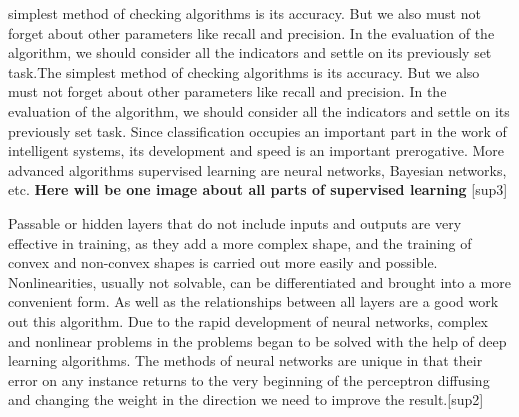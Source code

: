 simplest method of checking algorithms is its accuracy. But we also must not forget about other parameters like recall and precision. In the evaluation of the algorithm, we should consider all the indicators and settle on its previously set task.The simplest method of checking algorithms is its accuracy. But we also must not forget about other parameters like recall and precision. In the evaluation of the algorithm, we should consider all the indicators and settle on its previously set task. Since classification occupies an important part in the work of intelligent systems, its development and speed is an important prerogative. More advanced algorithms supervised learning are neural networks, Bayesian networks, etc. \textbf{Here will be one image about all parts of supervised learning} [sup3]


\par Passable or hidden layers that do not include inputs and outputs are very effective in training, as they add a more complex shape, and the training of convex and non-convex shapes is carried out more easily and possible. Nonlinearities, usually not solvable, can be differentiated and brought into a more convenient form. As well as the relationships between all layers are a good work out this algorithm. Due to the rapid development of neural networks, complex and nonlinear problems in the problems began to be solved with the help of deep learning algorithms. The methods of neural networks are unique in that their error on any instance returns to the very beginning of the perceptron diffusing and changing the weight in the direction we need to improve the result.[sup2]


